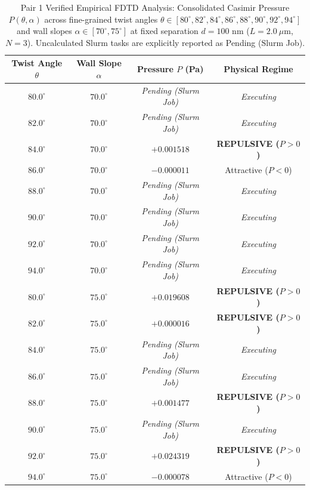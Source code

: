 \begin{table}[h!]
\centering
\caption{Pair 1 Verified Empirical FDTD Analysis: Consolidated Casimir Pressure $P(\theta, \alpha)$ across fine-grained twist angles $\theta \in [80^\circ, 82^\circ, 84^\circ, 86^\circ, 88^\circ, 90^\circ, 92^\circ, 94^\circ]$ and wall slopes $\alpha \in [70^\circ, 75^\circ]$ at fixed separation $d = 100$ nm ($L=2.0\ \mu\text{m}$, $N=3$). Uncalculated Slurm tasks are explicitly reported as Pending (Slurm Job).}
\begin{tabular}{cccc}
\hline
\textbf{Twist Angle $\theta$} & \textbf{Wall Slope $\alpha$} & \textbf{Pressure $P$ (Pa)} & \textbf{Physical Regime} \\
\hline
$80.0^\circ$ & $70.0^\circ$ & \textit{Pending (Slurm Job)} & \textit{Executing} \\
$82.0^\circ$ & $70.0^\circ$ & \textit{Pending (Slurm Job)} & \textit{Executing} \\
$84.0^\circ$ & $70.0^\circ$ & $+0.001518$ & \textbf{REPULSIVE ($P>0$)} \\
$86.0^\circ$ & $70.0^\circ$ & $-0.000011$ & Attractive ($P<0$) \\
$88.0^\circ$ & $70.0^\circ$ & \textit{Pending (Slurm Job)} & \textit{Executing} \\
$90.0^\circ$ & $70.0^\circ$ & \textit{Pending (Slurm Job)} & \textit{Executing} \\
$92.0^\circ$ & $70.0^\circ$ & \textit{Pending (Slurm Job)} & \textit{Executing} \\
$94.0^\circ$ & $70.0^\circ$ & \textit{Pending (Slurm Job)} & \textit{Executing} \\
$80.0^\circ$ & $75.0^\circ$ & $+0.019608$ & \textbf{REPULSIVE ($P>0$)} \\
$82.0^\circ$ & $75.0^\circ$ & $+0.000016$ & \textbf{REPULSIVE ($P>0$)} \\
$84.0^\circ$ & $75.0^\circ$ & \textit{Pending (Slurm Job)} & \textit{Executing} \\
$86.0^\circ$ & $75.0^\circ$ & \textit{Pending (Slurm Job)} & \textit{Executing} \\
$88.0^\circ$ & $75.0^\circ$ & $+0.001477$ & \textbf{REPULSIVE ($P>0$)} \\
$90.0^\circ$ & $75.0^\circ$ & \textit{Pending (Slurm Job)} & \textit{Executing} \\
$92.0^\circ$ & $75.0^\circ$ & $+0.024319$ & \textbf{REPULSIVE ($P>0$)} \\
$94.0^\circ$ & $75.0^\circ$ & $-0.000078$ & Attractive ($P<0$) \\
\hline
\end{tabular}
\end{table}


